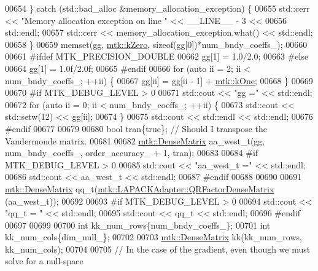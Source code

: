 \begin{DoxyCode}
{{00654   \} \textcolor{keywordflow}{catch} (std::bad\_alloc &memory\_allocation\_exception) \{
00655     std::cerr << \textcolor{stringliteral}{"Memory allocation exception on line "} << \_\_LINE\_\_ - 3 <<
00656       std::endl;
00657     std::cerr << memory\_allocation\_exception.what() << std::endl;
00658   \}
00659   memset(gg, \hyperlink{group__c01-roots_ga59a451a5fae30d59649bcda274fea271}{mtk::kZero}, \textcolor{keyword}{sizeof}(gg[0])*num\_bndy\_coeffs\_);
00660 
00661 \textcolor{preprocessor}{  #ifdef MTK\_PRECISION\_DOUBLE}
00662   gg[1] = 1.0/2.0;
00663 \textcolor{preprocessor}{  #else}
00664   gg[1] = 1.0f/2.0f;
00665 \textcolor{preprocessor}{  #endif}
00666   \textcolor{keywordflow}{for} (\textcolor{keyword}{auto} ii = 2; ii < num\_bndy\_coeffs\_; ++ii) \{
00667     gg[ii] = gg[ii - 1] + \hyperlink{group__c01-roots_ga26407c24d43b6b95480943340d285c71}{mtk::kOne};
00668   \}
00669 
00670 \textcolor{preprocessor}{  #if MTK\_DEBUG\_LEVEL > 0}
00671   std::cout << \textcolor{stringliteral}{"gg ="} << std::endl;
00672   \textcolor{keywordflow}{for} (\textcolor{keyword}{auto} ii = 0; ii < num\_bndy\_coeffs\_; ++ii) \{
00673     std::cout << std::setw(12) << gg[ii];
00674   \}
00675   std::cout << std::endl << std::endl;
00676 \textcolor{preprocessor}{  #endif}
00677 
00679 
00680   \textcolor{keywordtype}{bool} tran\{\textcolor{keyword}{true}\}; \textcolor{comment}{// Should I transpose the Vandermonde matrix.}
00681 
00682   \hyperlink{classmtk_1_1DenseMatrix}{mtk::DenseMatrix} aa\_west\_t(gg, num\_bndy\_coeffs\_, order\_accuracy\_ + 1, tran);
00683 
00684 \textcolor{preprocessor}{  #if MTK\_DEBUG\_LEVEL > 0}
00685   std::cout << \textcolor{stringliteral}{"aa\_west\_t ="} << std::endl;
00686   std::cout << aa\_west\_t << std::endl;
00687 \textcolor{preprocessor}{  #endif}
00688 
00690 
00691   \hyperlink{classmtk_1_1DenseMatrix}{mtk::DenseMatrix} qq\_t(\hyperlink{classmtk_1_1LAPACKAdapter_ae5c6e78c9c819c9ac7a6f31bfd011d7a}{mtk::LAPACKAdapter::QRFactorDenseMatrix}
      (aa\_west\_t));
00692 
00693 \textcolor{preprocessor}{  #if MTK\_DEBUG\_LEVEL > 0}
00694   std::cout << \textcolor{stringliteral}{"qq\_t = "} << std::endl;
00695   std::cout << qq\_t << std::endl;
00696 \textcolor{preprocessor}{  #endif}
00697 
00699 
00700   \textcolor{keywordtype}{int} kk\_num\_rows\{num\_bndy\_coeffs\_\};
00701   \textcolor{keywordtype}{int} kk\_num\_cols\{dim\_null\_\};
00702 
00703   \hyperlink{classmtk_1_1DenseMatrix}{mtk::DenseMatrix} kk(kk\_num\_rows, kk\_num\_cols);
00704 
00705   \textcolor{comment}{// In the case of the gradient, even though we must solve for a null-space}
}}
\end{DoxyCode}
